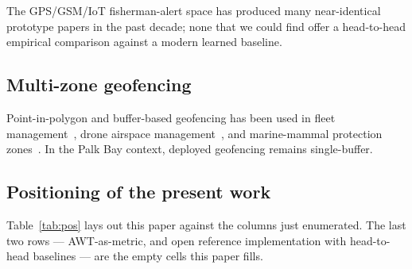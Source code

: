 \documentclass[conference]{IEEEtran}
\begin{document}
The GPS/GSM/IoT fisherman-alert space has produced many near-identical prototype papers in the past decade; none that we could find offer a head-to-head empirical comparison against a modern learned baseline.

\subsection{Multi-zone geofencing}

Point-in-polygon and buffer-based geofencing has been used in fleet management~\cite{reclus2009}, drone airspace management~\cite{dhondge2015}, and marine-mammal protection zones~\cite{williams2014}. In the Palk Bay context, deployed geofencing remains single-buffer.

\subsection{Positioning of the present work}

Table~\ref{tab:pos} lays out this paper against the columns just enumerated. The last two rows --- AWT-as-metric, and open reference implementation with head-to-head baselines --- are the empty cells this paper fills.
\end{document}
